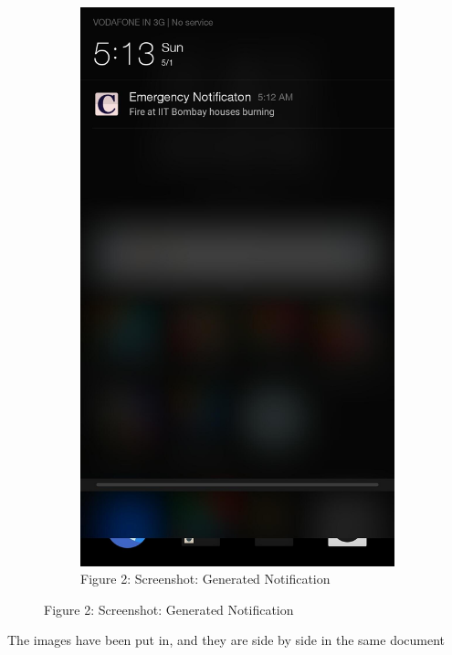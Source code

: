 \documentclass[english,12pt]{article}
\begin{document}
\begin{figure}[H]
\begin{subfigure}[t]{0.4\textwidth}
    \label{fig:1}
  \end{subfigure}
  \hspace{2mm}
  \begin{subfigure}[t]{0.4\textwidth}
    \includegraphics[width=\textwidth]{2}
    \caption*{\normalsize Figure 2: Screenshot: Generated Notification}
    \label{fig:2}
  \end{subfigure}
\end{figure}
The images have been put in, and they are side by side in the same document
\end{document}
